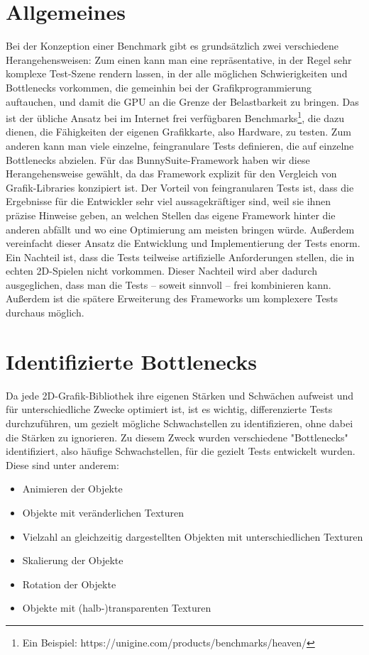 \section{Allgemeines}
Bei der Konzeption einer Benchmark gibt es grundsätzlich zwei verschiedene Herangehensweisen: Zum einen kann man eine repräsentative, in der Regel sehr komplexe Test-Szene rendern lassen, in der alle möglichen Schwierigkeiten und Bottlenecks vorkommen, die gemeinhin bei der Grafikprogrammierung auftauchen, und damit die GPU an die Grenze der Belastbarkeit zu bringen. Das ist der übliche Ansatz bei im Internet frei verfügbaren Benchmarks\footnote{Ein Beispiel: https://unigine.com/products/benchmarks/heaven/}, die dazu dienen, die Fähigkeiten der eigenen Grafikkarte, also Hardware, zu testen. Zum anderen kann man viele einzelne, feingranulare Tests definieren, die auf einzelne Bottlenecks abzielen. Für das BunnySuite-Framework haben wir diese Herangehensweise gewählt, da das Framework explizit für den Vergleich von Grafik-Libraries konzipiert ist. Der Vorteil von feingranularen Tests ist, dass die Ergebnisse für die Entwickler sehr viel aussagekräftiger sind, weil sie ihnen präzise Hinweise geben, an welchen Stellen das eigene Framework hinter die anderen abfällt und wo eine Optimierung am meisten bringen würde. Außerdem vereinfacht dieser Ansatz die Entwicklung und Implementierung der Tests enorm. Ein Nachteil ist, dass die Tests teilweise artifizielle Anforderungen stellen, die in echten 2D-Spielen nicht vorkommen. Dieser Nachteil wird aber dadurch ausgeglichen, dass man die Tests -- soweit sinnvoll -- frei kombinieren kann. Außerdem ist die spätere Erweiterung des Frameworks um komplexere Tests durchaus möglich.

\section{Identifizierte Bottlenecks}
\label{sec:bottlenecks}
Da jede 2D-Grafik-Bibliothek ihre eigenen Stärken und Schwächen aufweist und für unterschiedliche Zwecke optimiert ist, ist es wichtig, differenzierte Tests durchzuführen, um gezielt mögliche Schwachstellen zu identifizieren, ohne dabei die Stärken zu ignorieren. Zu diesem Zweck wurden verschiedene "Bottlenecks" identifiziert, also häufige Schwachstellen, für die gezielt Tests entwickelt wurden. Diese sind unter anderem:\\
\begin{itemize}
\item Animieren der Objekte
\item Objekte mit veränderlichen Texturen
\item Vielzahl an gleichzeitig dargestellten Objekten mit unterschiedlichen Texturen
\item Skalierung der Objekte
\item Rotation der Objekte
\item Objekte mit (halb-)transparenten Texturen
\end{itemize}


